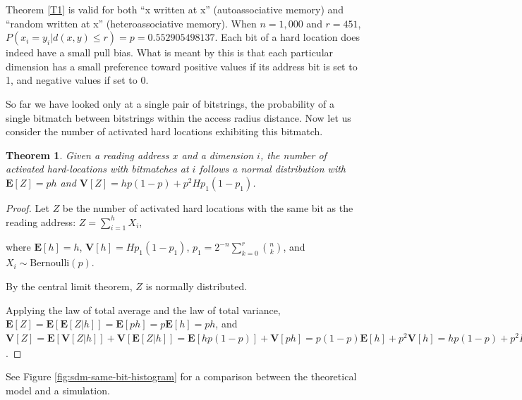 \documentclass[12pt]{article}
\newtheorem{theorem}{Theorem}[section]
\begin{document}
Theorem \ref{T1} is valid for both ``x written at x'' (autoassociative memory) and ``random written at x'' (heteroassociative memory). When $n=1,000$ and $r=451$, $P(x_i = y_i | d(x, y) \le r) = p = 0.552905498137$.  Each bit of a hard location does indeed have a small pull bias.  What is meant by this is that each particular dimension has a small preference toward positive values if its address bit is set to 1, and negative values if set to 0.

So far we have looked only at a single pair of bitstrings, the probability of a single bitmatch between bitstrings within the access radius distance.  Now let us consider the number of activated hard locations exhibiting this bitmatch.

\begin{theorem}
\emph{Given a reading address $x$ and a dimension $i$, the number of activated hard-locations with bitmatches at $i$ follows a normal distribution with }
\label{T2}
$\mathbf{E}[Z] = ph$ and $\mathbf{V}[Z] = hp(1-p) + p^2 H p_1 (1-p_1)$.

\end{theorem}


\begin{proof}
Let $Z$ be the number of activated hard locations with the same bit as the reading address:
$Z = \sum_{i=1}^{h} X_i$,

where $\mathbf{E}[h] = h$, $\mathbf{V}[h] = H p_1 (1-p_1)$, $p_1 = 2^{-n} \sum_{k=0}^{r} \binom{n}{k}$, and $X_i \sim \text{Bernoulli}(p)$.

By the central limit theorem, $Z$ is normally distributed.

Applying the law of total average and the law of total variance, $\mathbf{E}[Z] = \mathbf{E}[\mathbf{E}[Z | h]] = \mathbf{E}[ph] = p \mathbf{E}[h] = ph$, and $\mathbf{V}[Z] = \mathbf{E}[\mathbf{V}[Z|h]] + \mathbf{V}[\mathbf{E}[Z|h]] = \mathbf{E}[hp(1-p)] + \mathbf{V}[ph] = p(1-p) \mathbf{E}[h] + p^2 \mathbf{V}[h] = hp(1-p) + p^2 H p_1 (1-p_1)$.

\end{proof}


See Figure \ref{fig:sdm-same-bit-histogram} for a comparison between the theoretical model and a simulation.
\end{document}
